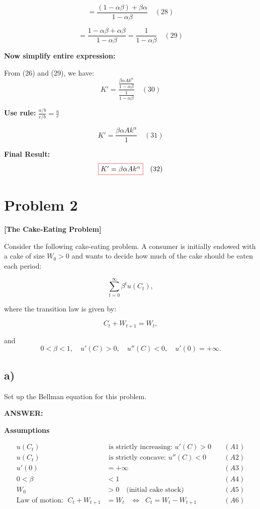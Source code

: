 \documentclass[12pt]{article}
\begin{document}
\[
=\frac{(1-\alpha\beta)+\beta\alpha}{1-\alpha\beta}
\quad (28)
\]

\[
=\frac{1-\alpha\beta+\alpha\beta}{1-\alpha\beta}
=\frac{1}{1-\alpha\beta}
\quad (29)
\]

\textbf{Now simplify entire expression:}

From (26) and (29), we have:
\[
K'=\frac{\tfrac{\beta\alpha A k^{\alpha}}{1-\alpha\beta}}{\tfrac{1}{1-\alpha\beta}}
\quad (30)
\]

\textbf{Use rule: } 
\(\frac{a/b}{c/b}=\frac{a}{c}\)

\[
K'=\frac{\beta \alpha A k^{\alpha}}{1}
\quad (31)
\]

\textbf{Final Result:}
\[
\fcolorbox{red}{white}{$
K'=\beta \alpha A k^{\alpha}
$}
\quad (32)
\]

\section*{\noindent\textbf{Problem 2}}

\noindent\textbf{[The Cake-Eating Problem]}  

Consider the following cake-eating problem. A consumer is initially endowed with a cake of size \( W_0 > 0 \) and wants to decide how much of the cake should be eaten each period:  

\[
\sum_{t=0}^{\infty} \beta^t u(C_t),
\]

where the transition law is given by:  

\[
C_t + W_{t+1} = W_t,
\]

and 
\[
0<\beta<1, \quad u'(C)>0, \quad u''(C)<0, \quad u'(0)=+\infty.
\]

\subsection*{\textbf{a)}}

Set up the Bellman equation for this problem.

\vspace{0.5em}
\noindent\textcolor{formalred}{\textbf{ANSWER:}}

\textbf{Assumptions}

\[
\begin{aligned}
u(C_t) & \text{ is strictly increasing: } u'(C) > 0 \quad & (A1) \\
u(C_t) & \text{ is strictly concave: } u''(C) < 0 \quad & (A2) \\
u'(0) &= +\infty \quad & (A3) \\
0 < \beta &< 1 \quad & (A4) \\
W_0 &> 0 \quad \text{(initial cake stock)} \quad & (A5) \\
\text{Law of motion: } \; C_t + W_{t+1} &= W_t \;\;\; \Leftrightarrow \;\; C_t = W_t - W_{t+1} \quad & (A6)
\end{aligned}
\]
\end{document}
